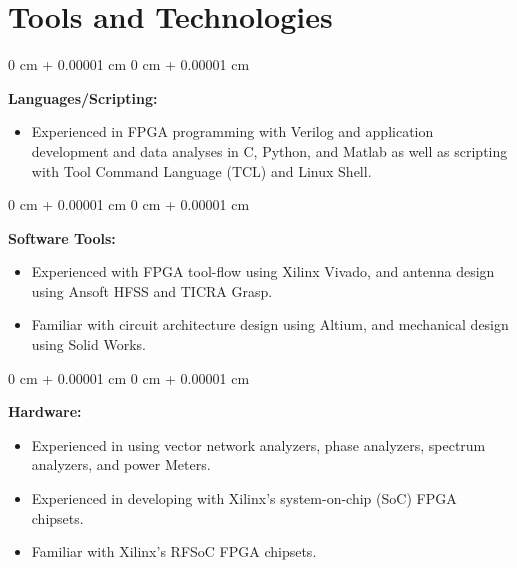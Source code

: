 \documentclass[10pt, letterpaper]{article}
\newenvironment{highlights}{
    \begin{itemize}[
        topsep=0.10 cm,
        parsep=0.10 cm,
        partopsep=0pt,
        itemsep=0pt,
        leftmargin=0 cm + 10pt     
    ]
}{
    \end{itemize}
} %
\newenvironment{onecolentry}{
    \begin{adjustwidth}{
        0 cm + 0.00001 cm
    }{
        0 cm + 0.00001 cm
    }
}{
    \end{adjustwidth}
} %
\begin{document}
    \section{Tools and Technologies}        
        \begin{onecolentry}
            \textbf{Languages/Scripting:} 
            \begin{highlights}
            \item Experienced in FPGA programming with Verilog and application development and data analyses in C, Python, and Matlab as well as scripting with Tool Command Language (TCL) and Linux Shell.              
            \end{highlights}

        \end{onecolentry}
        \vspace{0.2 cm}
        \begin{onecolentry}
            \textbf{Software Tools:}
            \begin{highlights}
                \item Experienced with FPGA tool-flow using Xilinx Vivado, and antenna design using Ansoft HFSS and TICRA Grasp. 
                \item Familiar with circuit architecture design using Altium, and mechanical design using Solid Works. 
            \end{highlights}
        \end{onecolentry}
        \vspace{0.2 cm}
        \begin{onecolentry}
            \textbf{Hardware:}  
            \begin{highlights}
                \item Experienced in using vector network analyzers, phase analyzers, spectrum analyzers, and power Meters. 
                \item Experienced in developing with Xilinx's system-on-chip (SoC) FPGA chipsets. 
                \item Familiar with Xilinx's RFSoC FPGA chipsets.                
            \end{highlights}

        \end{onecolentry} 

    
       

    \printbibliography[title=Publications]
    \nocite{Sheng2025}
    \nocite{Pradhan2025}
    \nocite{Pradhan2025ams}
    \nocite{Fung2024} 
    \nocite{Pradhan2023}
    \nocite{Pradhan2022}
        
\end{document}
